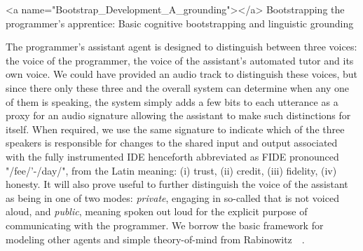 \rawhtml
<a name="Bootstrap_Development_A_grounding"></a>
\endrawhtml
Bootstrapping the programmer's apprentice: Basic cognitive bootstrapping and linguistic grounding

The programmer's assistant agent is designed to distinguish between three voices: the voice of the programmer, the voice of the assistant's automated tutor and its own voice. We could have provided an audio track to distinguish these voices, but since there only these three and the overall system can determine when any one of them is speaking, the system simply adds a few bits to each utterance as a proxy for an audio signature allowing the assistant to make such distinctions for itself. When required, we use the same signature to indicate which of the three speakers is responsible for changes to the shared input and output associated with the fully instrumented IDE henceforth abbreviated as FIDE \emdash{} pronounced "/fee/'-/day/", from the Latin meaning: (i) trust, (ii) credit, (iii) fidelity, (iv) honesty. It will also prove useful to further distinguish the voice of the assistant as being in one of two modes: {\it{private}}, engaging in so-called {} that is not voiced aloud, and {\it{public}}, meaning spoken out loud for the explicit purpose of communicating with the programmer. We borrow the basic framework for modeling other agents and simple theory-of-mind from Rabinowitz~\etal{}~\cite{RabinowitzetalCoRR-18}.

